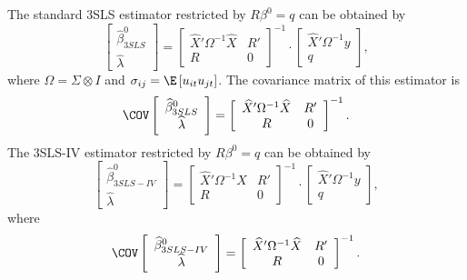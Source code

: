 The standard 3SLS estimator restricted by $R \beta^0 = q$ can be obtained by
\begin{equation}
   \left[ \begin{array}{c}
      \widehat{\beta}^0_{3SLS} \\ \widehat{\lambda}
   \end{array} \right]
   =
   \left[ \begin{array}{cc}
      \widehat{X}' \Omega^{-1} \widehat{X} & R' \\ 
      R & 0
   \end{array} \right]^{-1}
   \cdot
   \left[ \begin{array}{c}
      \widehat{X}' \Omega^{-1} y \\ q 
   \end{array} \right] ,
   \label{eq:3slsGlsR}
\end{equation}
where $\Omega = \Sigma \otimes I$ and
$\sigma_{ij} = \E \left[ u_{it} u_{jt} \right]$.
The covariance matrix of this estimator is
\begin{equation}
   \COV
   \left[ \begin{array}{c}
      \widehat{\beta}^0_{3SLS} \\ \widehat{\lambda}
   \end{array} \right] 
   = 
   \left[ \begin{array}{cc}
      \widehat{X}' \Omega^{-1} \widehat{X} & R' \\ 
      R & 0
   \end{array} \right]^{-1} .
   \label{eq:cov3slsr}
\end{equation}
The 3SLS-IV estimator restricted by $R \beta^0 = q$ can be obtained by
\begin{equation}
   \left[ \begin{array}{c}
      \widehat{\beta}^0_{3SLS-IV} \\ \widehat{\lambda}
   \end{array} \right]
   =
   \left[ \begin{array}{cc}
      \widehat{X}' \Omega^{-1} X & R' \\ 
      R & 0
   \end{array} \right]^{-1}
   \cdot
   \left[ \begin{array}{c}
      \widehat{X}' \Omega^{-1} y \\ q 
   \end{array} \right] ,
   \label{eq:3slsIvR}
\end{equation}
where
\begin{equation}
   \COV
   \left[ \begin{array}{c}
      \widehat{\beta}^0_{3SLS-IV} \\ \widehat{\lambda}
   \end{array} \right] 
   = 
   \left[ \begin{array}{cc}
      \widehat{X}' \Omega^{-1} \widehat{X} & R' \\ 
      R & 0
   \end{array} \right]^{-1} .
\end{equation}
